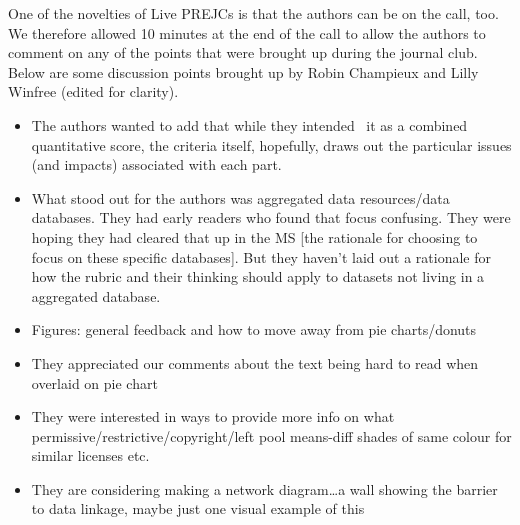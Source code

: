 \documentclass[10pt]{article}
\providecommand{\tightlist}{\setlength{\itemsep}{0pt}\setlength{\parskip}{0pt}}%
\begin{document}
One of the novelties of Live PREJCs is that the authors can be on the
call, too. We therefore allowed 10 minutes at the end of the call to
allow the authors to comment on any of the points that were brought up
during the journal club. Below are some discussion points brought up by
Robin Champieux and Lilly Winfree (edited for clarity).

\par\null

\begin{itemize}
\tightlist
\item
  The authors wanted to add that while they intended~ it as a combined
  quantitative score, the criteria itself, hopefully, draws out the
  particular issues (and impacts) associated with each part.
\end{itemize}

\begin{itemize}
\tightlist
\item
  What stood out for the authors was aggregated data resources/data
  databases. They had early readers who found that focus confusing. They
  were hoping they had cleared that up in the MS {[}the rationale for
  choosing to focus on these specific databases{]}. But they haven't
  laid out a rationale for how the rubric and their thinking should
  apply to datasets not living in a aggregated database.~
\end{itemize}

\begin{itemize}
\tightlist
\item
  Figures: general feedback and how to move away from pie charts/donuts
\end{itemize}

\begin{itemize}
\tightlist
\item
  They appreciated our comments about the text being hard to read when
  overlaid on pie chart
\end{itemize}

\begin{itemize}
\tightlist
\item
  They were interested in ways to provide more info on what
  permissive/restrictive/copyright/left pool means-diff shades of same
  colour for similar licenses etc.
\end{itemize}

\begin{itemize}
\tightlist
\item
  They are considering making a network diagram\ldots{}a wall showing
  the barrier to data linkage, maybe just one visual example of this
\end{itemize}
\end{document}
